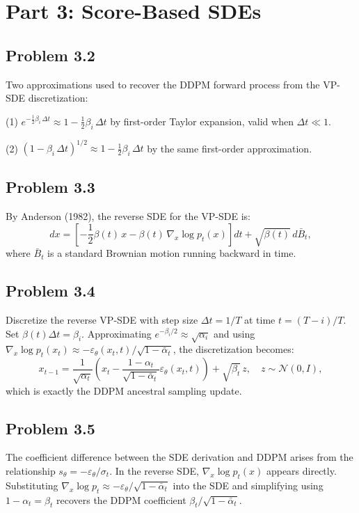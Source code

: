 \documentclass[11pt]{article}
\begin{document}
\section*{Part 3: Score-Based SDEs}

\subsection*{Problem 3.2}

Two approximations used to recover the DDPM forward process from the VP-SDE discretization:

(1) $e^{-\frac{1}{2}\beta_i\,\Delta t} \approx 1 - \frac{1}{2}\beta_i\,\Delta t$ by first-order Taylor expansion, valid when $\Delta t \ll 1$.

(2) $(1 - \beta_i\,\Delta t)^{1/2} \approx 1 - \frac{1}{2}\beta_i\,\Delta t$ by the same first-order approximation.

\subsection*{Problem 3.3}

By Anderson (1982), the reverse SDE for the VP-SDE is:
\[
dx = \left[-\frac{1}{2}\beta(t)\, x - \beta(t)\,\nabla_x \log p_t(x)\right]dt + \sqrt{\beta(t)}\, d\bar{B}_t,
\]
where $\bar{B}_t$ is a standard Brownian motion running backward in time.

\subsection*{Problem 3.4}

Discretize the reverse VP-SDE with step size $\Delta t = 1/T$ at time $t = (T-i)/T$. Set $\beta(t)\Delta t = \beta_i$. Approximating $e^{-\beta_i/2} \approx \sqrt{\alpha_i}$ and using $\nabla_x \log p_t(x_t) \approx -\varepsilon_\theta(x_t, t)/\sqrt{1-\bar\alpha_t}$, the discretization becomes:
\[
x_{t-1} = \frac{1}{\sqrt{\alpha_t}}\left(x_t - \frac{1-\alpha_t}{\sqrt{1-\bar\alpha_t}}\varepsilon_\theta(x_t,t)\right) + \sqrt{\beta_t}\, z,\quad z \sim \mathcal{N}(0,I),
\]
which is exactly the DDPM ancestral sampling update.

\subsection*{Problem 3.5}

The coefficient difference between the SDE derivation and DDPM arises from the relationship $s_\theta = -\varepsilon_\theta/\sigma_t$. In the reverse SDE, $\nabla_x \log p_t(x)$ appears directly. Substituting $\nabla_x \log p_t \approx -\varepsilon_\theta/\sqrt{1-\bar\alpha_t}$ into the SDE and simplifying using $1-\alpha_t = \beta_t$ recovers the DDPM coefficient $\beta_t/\sqrt{1-\bar\alpha_t}$.
\end{document}
